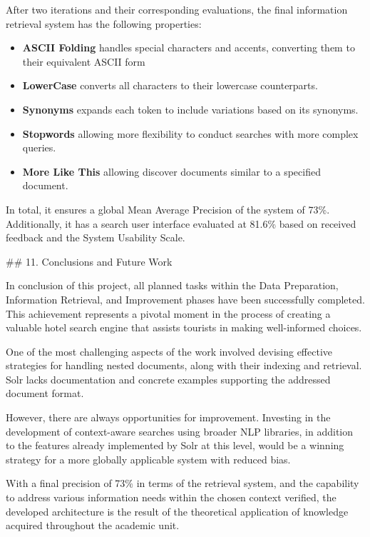 \documentclass[sigconf]{acmart}
\begin{document}
After two iterations and their corresponding evaluations, the final information retrieval system has the following properties:

\begin{itemize}
    \item \textbf{ASCII Folding} handles special characters and accents, converting them to their equivalent ASCII form
    \item \textbf{LowerCase} converts all characters to their lowercase counterparts.
    \item \textbf{Synonyms} expands each token to include variations based on its synonyms.
    \item \textbf{Stopwords} allowing more flexibility to conduct searches with more complex queries.
    \item \textbf{More Like This} allowing discover documents similar to a specified document.
\end{itemize}



In total, it ensures a global Mean Average Precision of the system of 73\%. Additionally, it has a search user interface evaluated at 81.6\% based on received feedback and the System Usability Scale.

## 11. Conclusions and Future Work

In conclusion of this project, all planned tasks within the Data Preparation, Information Retrieval, and Improvement phases have been successfully completed. This achievement represents a pivotal moment in the process of creating a valuable hotel search engine that assists tourists in making well-informed choices.

One of the most challenging aspects of the work involved devising effective strategies for handling nested documents, along with their indexing and retrieval. Solr lacks documentation and concrete examples supporting the addressed document format.

However, there are always opportunities for improvement. Investing in the development of context-aware searches using broader NLP libraries, in addition to the features already implemented by Solr at this level, would be a winning strategy for a more globally applicable system with reduced bias.

With a final precision of 73\% in terms of the retrieval system, and the capability to address various information needs within the chosen context verified, the developed architecture is the result of the theoretical application of knowledge acquired throughout the academic unit.
\end{document}
